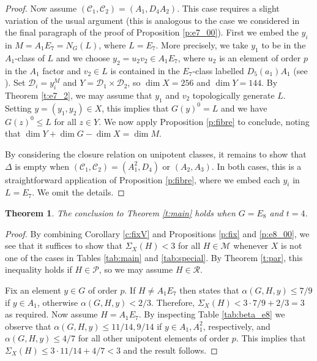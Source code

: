 \documentclass[twoside,a4paper,reqno,11pt]{amsart}
\renewcommand{\a}{\alpha}
\newcommand{\<}{\langle}
\renewcommand{\>}{\rangle}
\newcommand{\leqs}{\leqslant}
\renewcommand{\:}{\colon}
\theoremstyle{plain}
\newtheorem{thm}{Theorem}[section]
\theoremstyle{definition}
\begin{document}
\begin{proof}
Now assume $(\mathcal{C}_1,\mathcal{C}_2) = (A_1,D_4A_2)$. This case requires a slight variation of the usual argument (this is analogous to the case we considered in the final paragraph of the proof of Proposition \ref{p:e7_00}). First we embed the $y_i$ in $M = A_1E_7 = N_G(L)$, where $L = E_7$. More precisely, we take $y_1$ to be in the $A_1$-class of $L$ and we choose $y_2 = u_2v_2 \in A_1E_7$, where $u_2$ is an element of order $p$ in the $A_1$ factor and $v_2 \in L$ is contained in the $E_7$-class labelled $D_5(a_1)A_1$ (see \cite[Table 23]{Law2}). Set $\mathcal{D}_i = y_i^M$ and $Y = \mathcal{D}_1 \times \mathcal{D}_2$, so $\dim X = 256$ and $\dim Y = 144$. By Theorem \ref{t:e7_2}, we may assume that $y_1$ and $v_2$ topologically generate $L$. Setting $y = (y_1,y_2) \in X$, this implies that $G(y)^0 = L$ and we have $G(z)^0 \leqs L$ for all $z \in Y$. We now apply Proposition \ref{p:fibre} to conclude, noting that $\dim Y + \dim G - \dim X = \dim M$.

By considering the closure relation on unipotent classes, it remains to show that $\Delta$ is empty when $(\mathcal{C}_1,\mathcal{C}_2) = (A_1^2,D_4)$ or $(A_2,A_3)$. In both cases, this is a straightforward application of Proposition \ref{p:fibre}, where we embed each $y_i$ in $L = E_7$. We omit the details.
\end{proof}

\begin{thm}\label{t:e8_4}
The conclusion to Theorem \ref{t:main} holds when $G = E_8$ and $t=4$.
\end{thm}

\begin{proof}
By combining Corollary \ref{c:fixV} and Propositions \ref{p:fix} and \ref{p:e8_00}, we see that it suffices to show that $\Sigma_X(H)<3$ for all $H \in \mathcal{M}$ whenever $X$ is not one of the cases in Tables \ref{tab:main} and \ref{tab:special}. By Theorem \ref{t:par}, this inequality holds if $H \in \mathcal{P}$, so we may assume $H \in \mathcal{R}$.

Fix an element $y \in G$ of order $p$. If $H \ne A_1E_7$ then \cite[Theorem 3.1]{BGG1} states that $\a(G,H,y) \leqs 7/9$ if $y \in A_1$, otherwise $\a(G,H,y)<2/3$. Therefore, $\Sigma_X(H) < 3\cdot 7/9 + 2/3 = 3$ as required. Now assume $H = A_1E_7$. By inspecting Table \ref{tab:beta_e8} we observe that $\a(G,H,y) \leqs 11/14, 9/14$ if $y \in A_1, A_1^2$, respectively, and $\a(G,H,y) \leqs 4/7$ for all other unipotent elements of order $p$. This implies that $\Sigma_X(H) \leqs 3\cdot 11/14+4/7 <3$ and the result follows.
\end{proof}
\end{document}
